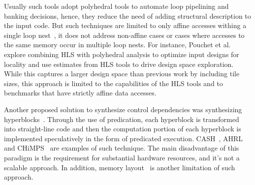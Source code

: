 
Usually such tools adopt polyhedral tools to automate loop pipelining and banking decisions, hence, they reduce the need of adding structural description to the input code.
But such techniques are limited to only affine accesses withing a single loop nest~\cite{wang_2014_theory}, it does not address non-affine cases or cases where accesses to the same memory occur in multiple loop nests.
For instance, Pouchet et al.~\cite{pouchet_2013_polyhedral}  explore combining HLS with polyhedral analysis to optimize input designs for locality and use estimates from HLS tools to drive design space exploration.
While this captures a larger design space than previous work by including tile sizes, this approach is limited to the capabilities of the HLS tools and to benchmarks that have strictly affine data accesses.

Another proposed solution to synthesize control dependencies was synthesizing hyperblocks~\cite{hyperblock}.
Through the use of predication, each hyperblock is transformed into straight-line code and then the computation portion of each hyperblock is implemented speculatively in the form of predicated execution.
CASH~\cite{budiu_cash_2002, budiu_pegasus_2002}, AHRL~\cite{ahrl} and CHiMPS~\cite{chimps} are examples of such technique.
The main disadvantage of this paradigm is the requirement for substantial hardware resources, and it's not a scalable approach. 
In addition, memory layout~\cite{spatial_computation} is another limitation of such approach.

